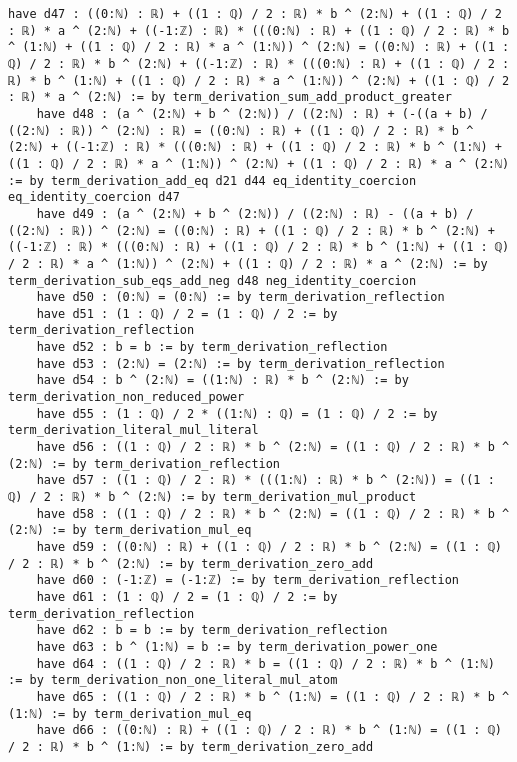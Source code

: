 \documentclass{article}
\begin{document}
\begin{tcolorbox}[colback=white!10, width=\linewidth]
\begin{lstlisting}[language=Lean4]
    have d47 : ((0:ℕ) : ℝ) + ((1 : ℚ) / 2 : ℝ) * b ^ (2:ℕ) + ((1 : ℚ) / 2 : ℝ) * a ^ (2:ℕ) + ((-1:ℤ) : ℝ) * (((0:ℕ) : ℝ) + ((1 : ℚ) / 2 : ℝ) * b ^ (1:ℕ) + ((1 : ℚ) / 2 : ℝ) * a ^ (1:ℕ)) ^ (2:ℕ) = ((0:ℕ) : ℝ) + ((1 : ℚ) / 2 : ℝ) * b ^ (2:ℕ) + ((-1:ℤ) : ℝ) * (((0:ℕ) : ℝ) + ((1 : ℚ) / 2 : ℝ) * b ^ (1:ℕ) + ((1 : ℚ) / 2 : ℝ) * a ^ (1:ℕ)) ^ (2:ℕ) + ((1 : ℚ) / 2 : ℝ) * a ^ (2:ℕ) := by term_derivation_sum_add_product_greater
    have d48 : (a ^ (2:ℕ) + b ^ (2:ℕ)) / ((2:ℕ) : ℝ) + (-((a + b) / ((2:ℕ) : ℝ)) ^ (2:ℕ) : ℝ) = ((0:ℕ) : ℝ) + ((1 : ℚ) / 2 : ℝ) * b ^ (2:ℕ) + ((-1:ℤ) : ℝ) * (((0:ℕ) : ℝ) + ((1 : ℚ) / 2 : ℝ) * b ^ (1:ℕ) + ((1 : ℚ) / 2 : ℝ) * a ^ (1:ℕ)) ^ (2:ℕ) + ((1 : ℚ) / 2 : ℝ) * a ^ (2:ℕ) := by term_derivation_add_eq d21 d44 eq_identity_coercion eq_identity_coercion d47
    have d49 : (a ^ (2:ℕ) + b ^ (2:ℕ)) / ((2:ℕ) : ℝ) - ((a + b) / ((2:ℕ) : ℝ)) ^ (2:ℕ) = ((0:ℕ) : ℝ) + ((1 : ℚ) / 2 : ℝ) * b ^ (2:ℕ) + ((-1:ℤ) : ℝ) * (((0:ℕ) : ℝ) + ((1 : ℚ) / 2 : ℝ) * b ^ (1:ℕ) + ((1 : ℚ) / 2 : ℝ) * a ^ (1:ℕ)) ^ (2:ℕ) + ((1 : ℚ) / 2 : ℝ) * a ^ (2:ℕ) := by term_derivation_sub_eqs_add_neg d48 neg_identity_coercion
    have d50 : (0:ℕ) = (0:ℕ) := by term_derivation_reflection
    have d51 : (1 : ℚ) / 2 = (1 : ℚ) / 2 := by term_derivation_reflection
    have d52 : b = b := by term_derivation_reflection
    have d53 : (2:ℕ) = (2:ℕ) := by term_derivation_reflection
    have d54 : b ^ (2:ℕ) = ((1:ℕ) : ℝ) * b ^ (2:ℕ) := by term_derivation_non_reduced_power
    have d55 : (1 : ℚ) / 2 * ((1:ℕ) : ℚ) = (1 : ℚ) / 2 := by term_derivation_literal_mul_literal
    have d56 : ((1 : ℚ) / 2 : ℝ) * b ^ (2:ℕ) = ((1 : ℚ) / 2 : ℝ) * b ^ (2:ℕ) := by term_derivation_reflection
    have d57 : ((1 : ℚ) / 2 : ℝ) * (((1:ℕ) : ℝ) * b ^ (2:ℕ)) = ((1 : ℚ) / 2 : ℝ) * b ^ (2:ℕ) := by term_derivation_mul_product
    have d58 : ((1 : ℚ) / 2 : ℝ) * b ^ (2:ℕ) = ((1 : ℚ) / 2 : ℝ) * b ^ (2:ℕ) := by term_derivation_mul_eq
    have d59 : ((0:ℕ) : ℝ) + ((1 : ℚ) / 2 : ℝ) * b ^ (2:ℕ) = ((1 : ℚ) / 2 : ℝ) * b ^ (2:ℕ) := by term_derivation_zero_add
    have d60 : (-1:ℤ) = (-1:ℤ) := by term_derivation_reflection
    have d61 : (1 : ℚ) / 2 = (1 : ℚ) / 2 := by term_derivation_reflection
    have d62 : b = b := by term_derivation_reflection
    have d63 : b ^ (1:ℕ) = b := by term_derivation_power_one
    have d64 : ((1 : ℚ) / 2 : ℝ) * b = ((1 : ℚ) / 2 : ℝ) * b ^ (1:ℕ) := by term_derivation_non_one_literal_mul_atom
    have d65 : ((1 : ℚ) / 2 : ℝ) * b ^ (1:ℕ) = ((1 : ℚ) / 2 : ℝ) * b ^ (1:ℕ) := by term_derivation_mul_eq
    have d66 : ((0:ℕ) : ℝ) + ((1 : ℚ) / 2 : ℝ) * b ^ (1:ℕ) = ((1 : ℚ) / 2 : ℝ) * b ^ (1:ℕ) := by term_derivation_zero_add

\end{lstlisting}
\end{tcolorbox}
\end{document}
